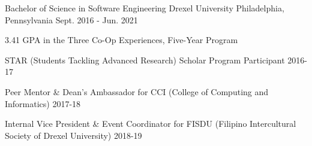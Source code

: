 

\begin{cventries}

  \cventry
    {Bachelor of Science in Software Engineering} %
    {Drexel University} %
    {Philadelphia, Pennsylvania} %
    {Sept. 2016 - Jun. 2021} %
    {
      \begin{cvitems} %
        \item 3.41 GPA in the Three Co-Op Experiences, Five-Year Program
        \item STAR (Students Tackling Advanced Research) Scholar Program Participant 2016-17
        \item Peer Mentor \& Dean's Ambassador for CCI (College of Computing and Informatics) 2017-18
        \item Internal Vice President \& Event Coordinator for FISDU (Filipino Intercultural Society of Drexel University) 2018-19
      \end{cvitems}
    }

\end{cventries}
